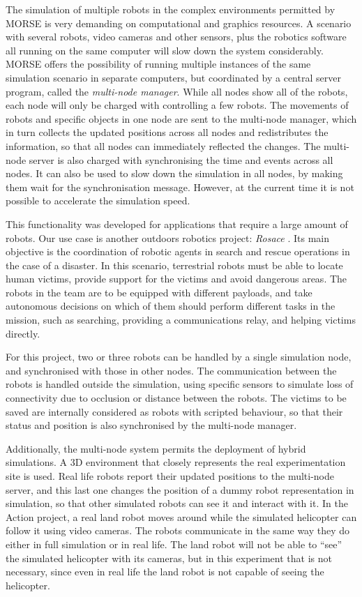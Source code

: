 \documentclass{llncs}
\begin{document}
The simulation of multiple robots in the complex environments permitted by
MORSE is very demanding on computational and graphics resources.
A scenario with several robots, video cameras and
other sensors, plus the robotics software all running on the same computer will
slow down the system considerably. MORSE offers the possibility of running
multiple instances of the same simulation scenario in separate computers, but
coordinated by a central server program, called the \emph{multi-node
manager}. While all nodes show all of the robots, each node will only
be charged with controlling a few robots. The movements
of robots and specific objects in one node are sent to the multi-node
manager, which in turn collects the updated positions across all nodes
and redistributes the information, so that all nodes can immediately
reflected the changes. The multi-node server is also charged with
synchronising the time and events across all nodes. It can also be used
to slow down the simulation in all nodes, by making them wait for the
synchronisation message. However, at the current time it is not possible to
accelerate the simulation speed.

This functionality was developed for applications that require a large amount
of robots. Our use case is another outdoors robotics project: \emph{Rosace}
\cite{springerlink:10.1007/978-3-642-12384-9_18,springerlink:10.1007/978-3-642-28786-2_32}.
Its main objective is the coordination of robotic agents in search and rescue
operations in the case of a disaster. In this scenario, terrestrial robots must
be able to locate human victims, provide support for the victims and avoid
dangerous areas. The robots in the team are to be equipped with different
payloads, and take autonomous decisions on which of them should perform
different tasks in the mission, such as searching, providing a communications
relay, and helping victims directly.

For this project, two or three robots can be handled by a single simulation
node, and synchronised with those in other nodes. The communication between the
robots is handled outside the simulation, using specific sensors to simulate
loss of connectivity due to occlusion or distance between the robots.
The victims to be saved are internally considered as robots with scripted
behaviour, so that their status and position is also synchronised by the
multi-node manager.

Additionally, the multi-node system permits the deployment of hybrid
simulations. A 3D environment that closely represents the real experimentation
site is used. Real life robots report their updated positions to the multi-node
server, and this last one changes the position of a dummy robot representation
in simulation, so that other simulated robots can see it and interact with it.
In the Action project, a real land robot moves around while the simulated
helicopter can follow it using video cameras.
The robots communicate in the same way they do either in full simulation or in
real life.  The land robot will not be able to ``see'' the simulated helicopter
with its cameras, but in this experiment that is not necessary, since even in
real life the land robot is not capable of seeing the helicopter.
\end{document}
